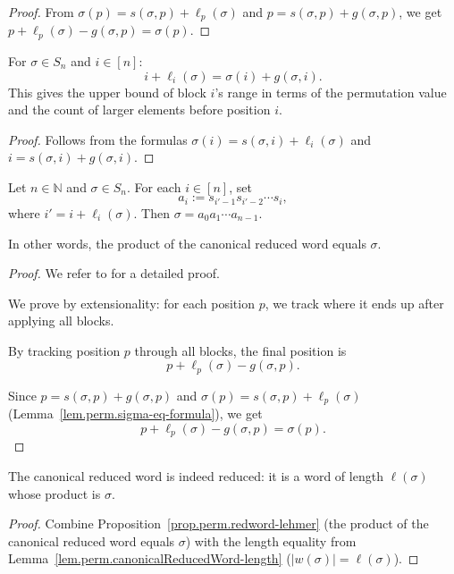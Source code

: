 \begin{proof}
From $\sigma(p) = s(\sigma, p) + \ell_p(\sigma)$
and $p = s(\sigma, p) + g(\sigma, p)$,
we get $p + \ell_p(\sigma) - g(\sigma, p) = \sigma(p)$.
\end{proof}

\begin{lemma}
\label{lem.perm.lehmerEntry_range_upper}
\leanhelper
\leanok
For $\sigma \in S_n$ and $i \in [n]$:
\[
i + \ell_i(\sigma) = \sigma(i) + g(\sigma, i).
\]
This gives the upper bound of block $i$'s range in terms of the permutation value
and the count of larger elements before position $i$.
\end{lemma}

\begin{proof}
Follows from the formulas $\sigma(i) = s(\sigma, i) + \ell_i(\sigma)$
and $i = s(\sigma, i) + g(\sigma, i)$.
\end{proof}

\begin{proposition}
\label{prop.perm.redword-lehmer}
\leantarget
\leanok
Let $n \in \mathbb{N}$ and $\sigma \in S_n$.
For each $i \in [n]$, set
\[
a_i := s_{i'-1} s_{i'-2} \cdots s_i,
\]
where $i' = i + \ell_i(\sigma)$. Then $\sigma = a_0 a_1 \cdots a_{n-1}$.

In other words, the product of the canonical reduced word equals $\sigma$.
\end{proposition}

\begin{proof}
We refer to \cite[Exercise 5.21 parts \textbf{(b)} and \textbf{(c)}]{detnotes}
for a detailed proof.

We prove by extensionality: for each position $p$, we track where it ends up
after applying all blocks.

By tracking position $p$ through all blocks, the final
position is
\[
p + \ell_p(\sigma) - g(\sigma, p).
\]

Since $p = s(\sigma, p) + g(\sigma, p)$
and $\sigma(p) = s(\sigma, p) + \ell_p(\sigma)$
(Lemma~\ref{lem.perm.sigma-eq-formula}), we get
\[
p + \ell_p(\sigma) - g(\sigma, p) = \sigma(p).
\]
\end{proof}

\begin{theorem}
\label{thm.perm.canonicalReducedWord-isReduced}
\leanhelper
\leanok
The canonical reduced word is indeed reduced: it is a word of length $\ell(\sigma)$
whose product is $\sigma$.
\end{theorem}

\begin{proof}
\leanok
Combine Proposition~\ref{prop.perm.redword-lehmer}
(the product of the canonical reduced word equals $\sigma$)
with the length equality from Lemma~\ref{lem.perm.canonicalReducedWord-length}
($|w(\sigma)| = \ell(\sigma)$).
\end{proof}
